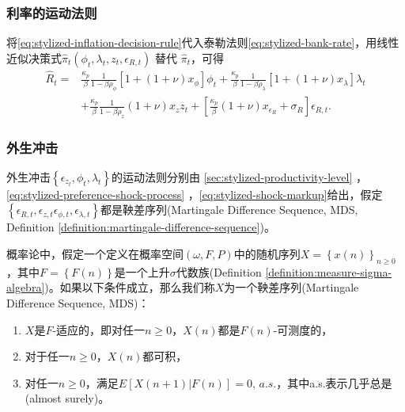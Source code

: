 \subsubsection{利率的运动法则}
\label{sec:stylized-solution-return-rate}
将\eqref{eq:stylized-inflation-decision-rule}代入泰勒法则\eqref{eq:stylized-bank-rate}，用线性近似决策式$\hat{\pi}_{t} \left( \phi_{t}, \lambda_{t}, z_{t}, \epsilon_{R,t}  \right)$ 替代 $\hat{\pi}_{t}$，可得
\begin{equation}
   \label{eq:stylized-return-rate-decision-rule}
   \begin{split}
     \hat{R}_{t} =
     & \frac{\kappa_{p}}{\beta} \frac{1}{1 - \beta \rho_{\phi}}
     \left[ 1 + \left( 1 + \nu \right) x_{\phi} \right] \phi_{t}
     + \frac{\kappa_{p}}{\beta} \frac{1}{1 - \beta \rho_{\lambda}}
     \left[ 1 + \left( 1 + \nu \right) x_{\lambda} \right] \lambda_{t} \\
     & + \frac{\kappa_{p}}{\beta} \frac{1}{1 - \beta \rho_{z}}
     \left( 1 + \nu \right) x_{z} z_{t}
     + \left[ \frac{\kappa_{p}}{\beta}  \left( 1 + \nu \right) x_{\epsilon_{R}} + \sigma_{R} \right] \epsilon_{R,t}.
   \end{split}
\end{equation}

\subsubsection{外生冲击}
\label{sec:stylized-solution-shocks}
外生冲击$\left\{ \epsilon_{z_{t}}, \phi_{t}, \lambda_{t} \right\}$的运动法则分别由
\eqref{sec:stylized-productivity-level}
，\eqref{eq:stylized-preference-shock-process}
，\eqref{eq:stylized-shock-markup}给出，假定$\left\{ \epsilon_{R,t}, \epsilon_{z,t} \epsilon_{\phi, t}, \epsilon_{\lambda, t} \right\} $都是鞅差序列(Martingale Difference Sequence, MDS, Definition \ref{definition:martingale-difference-sequence})。

\begin{definition}[鞅差序列]
  \label{definition:martingale-difference-sequence}
  概率论中，假定一个定义在概率空间$\left( \omega, F, P \right)$中的随机序列$X = \left\{ x(n) \right\}_{n \ge 0}$，其中$F=\left\{ F(n) \right\}$是一个上升$\sigma$代数族(Definition \ref{definition:measure-sigma-algebra})。如果以下条件成立，那么我们称$X$为一个鞅差序列(Martingale Difference Sequence, MDS)：
  \begin{enumerate}
    \item $X$是$F$-适应的，即对任一$n \ge 0$，$X(n)$都是$F(n)$-可测度的，
    \item 对于任一$n \ge 0$，$X(n)$都可积，
    \item 对任一$n \ge 0$，满足$E \left[ X(n+1) | F(n) \right]=0, \, a.s.$，其中a.s.表示几乎总是(almost surely)。
  \end{enumerate}
\end{definition}

